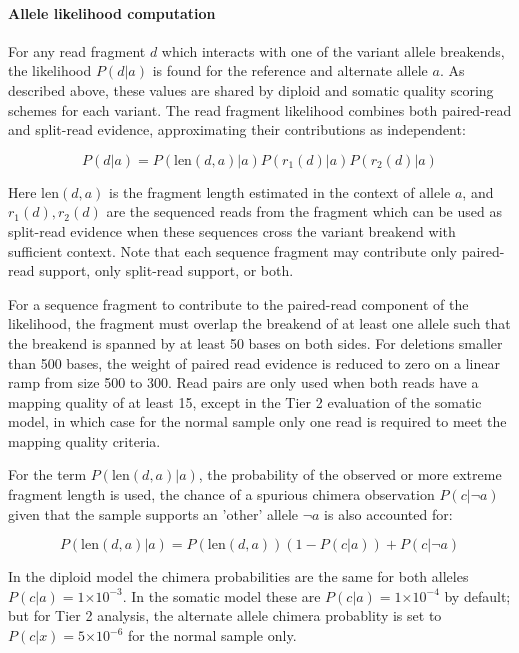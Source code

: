 \documentclass{article}
\newcommand{\e}[1]{\ensuremath{\times 10^{#1}}}
\begin{document}
\paragraph{Allele likelihood computation}

For any read fragment $d$ which interacts with one of the variant allele breakends, the likelihood $P(d \vert a)$ is found for the reference and alternate allele $a$. As described above, these values are shared by diploid and somatic quality scoring schemes for each variant. The read fragment likelihood combines both paired-read and split-read evidence, approximating their contributions as independent:

\begin{equation*}
P(d \vert a) = P ( \text{len}(d,a) \vert a) P( r_1(d) \vert a) P ( r_2(d) \vert a)
\end{equation*}

Here $\text{len}(d,a)$ is the fragment length estimated in the context of allele $a$, and $r_1(d),r_2(d)$ are the sequenced reads from the fragment which can be used as split-read evidence when these sequences cross the variant breakend with sufficient context. Note that each sequence fragment may contribute only paired-read support, only split-read support, or both.

For a sequence fragment to contribute to the paired-read component of the likelihood, the fragment must overlap the breakend of at least one allele such that the breakend is spanned by at least 50 bases on both sides. For deletions smaller than 500 bases, the weight of paired read evidence is reduced to zero on a linear ramp from size 500 to 300. Read pairs are only used when both reads have a mapping quality of at least 15, except in the Tier 2 evaluation of the somatic model, in which case for the normal sample only one read is required to meet the mapping quality criteria.

For the term $P ( \text{len}(d,a) \vert a)$, the probability of the observed or more extreme fragment length is used, the chance of a spurious chimera observation $P(c \vert \neg a)$ given that the sample supports an 'other' allele $\neg a$ is also accounted for:

\begin{equation*}
P ( \text{len}(d,a) \vert a) = P ( \text{len}(d,a) ) (1-P(c \vert a))  + P (c \vert \neg a)
\end{equation*}

In the diploid model the chimera probabilities are the same for both alleles $P(c \vert a) =  1\e{-3}$. In the somatic model these are $P(c \vert a) =  1\e{-4}$ by default; but for Tier 2 analysis, the alternate allele chimera probablity is set to $P(c \vert x) =  5\e{-6}$ for the normal sample only.
\end{document}
